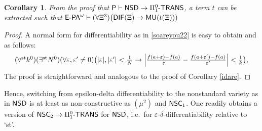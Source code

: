 \documentclass[reqno]{amsart}
\newtheorem{cor}[thm]{Corollary}
\def\P{\textup{\textsf{P}}}
\def\st{\textup{st}}
\def\di{\rightarrow}
\def\eps{\varepsilon}
\def\paai{\Pi_{1}^{0}\textup{-\textsf{TRANS}}}
\def\NSC{\textup{\textsf{NSC}}}
\def\NSD{\textup{\textsf{NSD}}}
\def\MU{\textup{\textsf{MU}}}
\numberwithin{equation}{section}
\numberwithin{thm}{section}
\begin{document}
\begin{cor}\label{idarecor}
From the proof that $\P\vdash \NSD\di \paai$, a term $t$ can be extracted such that $\textsf{\textup{E-PA}}^{\omega}\vdash (\forall \Xi^{3})\big(\textsf{\textup{DIF}}(\Xi)\di \MU(t(\Xi)))$
\end{cor}
\begin{proof}
A normal form for differentiability as in \eqref{soareyou22} is easy to obtain and as follows:  
\[\textstyle
(\forall^{\st}k^{0})(\exists^{\st} N^{0})(\forall \eps, \eps' \ne0)\big(|\eps|, |\eps'| <\frac{1}{N} \di \left|\frac{f(a+\eps)-f(a)}{\eps}- \frac{f(a+\eps')-f(a)}{\eps'}\right|<\frac{1}{k}\big),
\]
The proof is straightforward and analogous to the proof of Corollary \ref{idare}.  
\end{proof}
Hence, switching from epsilon-delta differentiability to the nonstandard variety as in $\NSD$ is at least as non-constructive as $(\mu^{2})$ and $\NSC_{1}$.  
One readily obtains a version of $\NSC_{2}\di \paai$ for $\NSD$, i.e.\ for $\eps$-$\delta$-differentiability relative to `st'.  

\medskip
\end{document}
